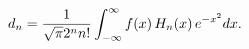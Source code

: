 \[d_{n}=\frac{1}{\sqrt{\pi}2^{n}n!}\int_{-\infty}^{\infty}f(x)\mathop{H_{n}\/}%
\nolimits\!\left(x\right)e^{-x^{2}}dx.\]
